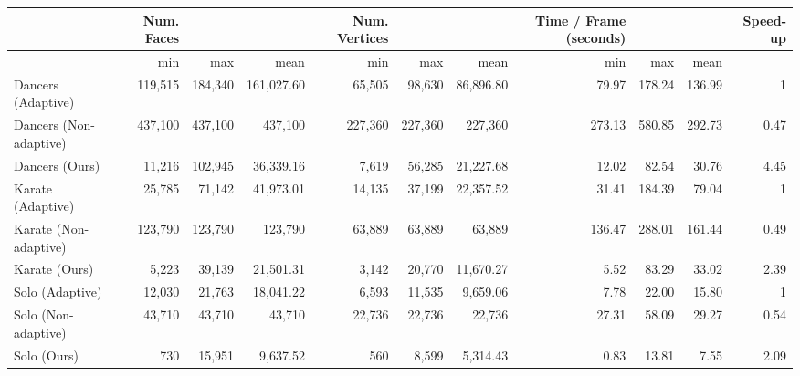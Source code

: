 \begin{tabular}{lrrrrrrrrrr}
\toprule
{} &  Num. Faces &         &            &  Num. Vertices &         &           &  Time / Frame (seconds) &        &        &  Speed-up \\
\midrule
{} &         min &     max &       mean &            min &     max &      mean &                     min &    max &   mean &           \\
Dancers (Adaptive)     &     119,515 & 184,340 & 161,027.60 &         65,505 &  98,630 & 86,896.80 &                   79.97 & 178.24 & 136.99 &         1 \\
Dancers (Non-adaptive) &     437,100 & 437,100 &    437,100 &        227,360 & 227,360 &   227,360 &                  273.13 & 580.85 & 292.73 &      0.47 \\
Dancers (Ours)         &      11,216 & 102,945 &  36,339.16 &          7,619 &  56,285 & 21,227.68 &                   12.02 &  82.54 &  30.76 &      4.45 \\
Karate (Adaptive)      &      25,785 &  71,142 &  41,973.01 &         14,135 &  37,199 & 22,357.52 &                   31.41 & 184.39 &  79.04 &         1 \\
Karate (Non-adaptive)  &     123,790 & 123,790 &    123,790 &         63,889 &  63,889 &    63,889 &                  136.47 & 288.01 & 161.44 &      0.49 \\
Karate (Ours)          &       5,223 &  39,139 &  21,501.31 &          3,142 &  20,770 & 11,670.27 &                    5.52 &  83.29 &  33.02 &      2.39 \\
Solo (Adaptive)        &      12,030 &  21,763 &  18,041.22 &          6,593 &  11,535 &  9,659.06 &                    7.78 &  22.00 &  15.80 &         1 \\
Solo (Non-adaptive)    &      43,710 &  43,710 &     43,710 &         22,736 &  22,736 &    22,736 &                   27.31 &  58.09 &  29.27 &      0.54 \\
Solo (Ours)            &         730 &  15,951 &   9,637.52 &            560 &   8,599 &  5,314.43 &                    0.83 &  13.81 &   7.55 &      2.09 \\
\bottomrule
\end{tabular}
